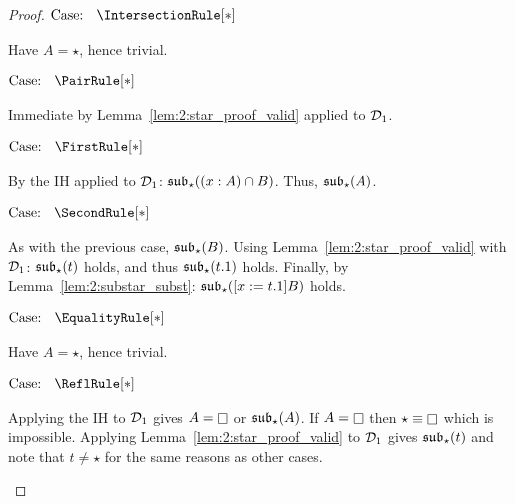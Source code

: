 \begin{proof}
    $\text{Case: }\begin{array}{c} \IntersectionRule[*] \end{array}$
    \begin{proofcase}
        Have $A = \star$, hence trivial.
    \end{proofcase}

    $\text{Case: }\begin{array}{c} \PairRule[*] \end{array}$
    \begin{proofcase}
        Immediate by Lemma~\ref{lem:2:star_proof_valid} applied to $\mathcal{D}_{1}$.
    \end{proofcase}

    $\text{Case: }\begin{array}{c} \FirstRule[*] \end{array}$
    \begin{proofcase}
        By the IH applied to $\mathcal{D}_{1}$: $\mathfrak{sub}_\star((x : A) \cap B)$.
        Thus, $\mathfrak{sub}_\star(A)$.
    \end{proofcase}

    $\text{Case: }\begin{array}{c} \SecondRule[*] \end{array}$
    \begin{proofcase}
        As with the previous case, $\mathfrak{sub}_\star(B)$.
        Using Lemma~\ref{lem:2:star_proof_valid} with $\mathcal{D}_{1}$: $\mathfrak{sub}_\star(t)$ holds, and thus $\mathfrak{sub}_\star(t.1)$ holds.
        Finally, by Lemma~\ref{lem:2:substar_subst}: $\mathfrak{sub}_\star([x := t.1]B)$ holds.
    \end{proofcase}

    $\text{Case: }\begin{array}{c} \EqualityRule[*] \end{array}$
    \begin{proofcase}
        Have $A = \star$, hence trivial.
    \end{proofcase}

    $\text{Case: }\begin{array}{c} \ReflRule[*] \end{array}$
    \begin{proofcase}
        Applying the IH to $\mathcal{D}_{1}$ gives $A = \kind$ or $\mathfrak{sub}_\star(A)$.
        If $A = \kind$ then $\star \equiv \kind$ which is impossible.
        Applying Lemma~\ref{lem:2:star_proof_valid} to $\mathcal{D}_{1}$ gives $\mathfrak{sub}_\star(t)$ and note that $t \neq \star$ for the same reasons as other cases.
    \end{proofcase}


\end{proof}
